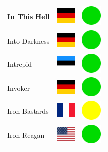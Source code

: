 \documentclass[12pt, a4paper, twoside]{report}
\begin{document}
\begin{center}
\begin{longtable}{|p{5cm}|p{2cm}|p{2cm}|}
 In This Hell                                               & \includegraphics[width=1cm]{../img/flags/de} &   \includegraphics[width=1cm]{../likes/y} \\ \hline
 Into Darkness                                              & \includegraphics[width=1cm]{../img/flags/de} &   \includegraphics[width=1cm]{../likes/y} \\ \hline
 Intrepid                                                   & \includegraphics[width=1cm]{../img/flags/ee} &   \includegraphics[width=1cm]{../likes/y} \\ \hline
 Invoker                                                    & \includegraphics[width=1cm]{../img/flags/de} &   \includegraphics[width=1cm]{../likes/y} \\ \hline
 Iron Bastards                                              & \includegraphics[width=1cm]{../img/flags/fr} &   \includegraphics[width=1cm]{../likes/m} \\ \hline
 Iron Reagan                                                & \includegraphics[width=1cm]{../img/flags/us} &   \includegraphics[width=1cm]{../likes/y} \\ \hline

\end{longtable}
\end{center}
\end{document}
